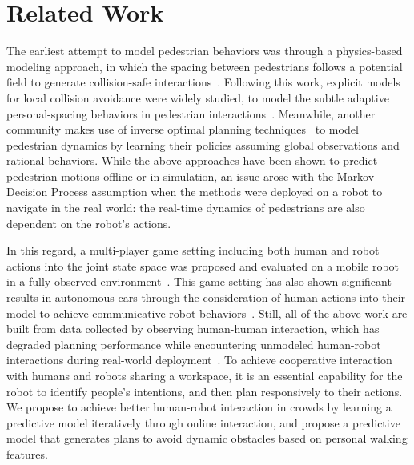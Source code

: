 \documentclass[conference]{IEEEtran}
\begin{document}
\section{Related Work}
\label{sec:related}
\vspace{-0.4em}
The earliest attempt to model pedestrian behaviors was through a physics-based 
modeling approach, in which the spacing between pedestrians follows a 
potential field to generate collision-safe 
interactions~\cite{helbing1995social}. Following this work, explicit models 
for local collision avoidance were widely studied, to model the subtle 
adaptive personal-spacing behaviors in pedestrian 
interactions~\cite{papadakis2014adaptive}. Meanwhile, another community 
makes use of inverse optimal planning 
techniques~\cite{ziebart2009planning,henry2010learning,vasquez2014inverse} to 
model pedestrian dynamics by learning their policies assuming global observations and 
rational behaviors.
While the above approaches have been shown to predict pedestrian motions 
offline or in simulation, an issue arose with the Markov Decision 
Process assumption when the methods were deployed on a robot to navigate in the real world:
the real-time dynamics of pedestrians are also dependent on the robot's 
actions. 

In this regard, a multi-player game setting including both human and robot actions into the joint state space was proposed and evaluated on a mobile robot in a fully-observed environment~\cite{trautman2010unfreezing}. This game setting has also shown significant results in autonomous cars through the consideration of human actions into their model to achieve communicative robot behaviors~\cite{sadigh2016planning}.
Still, all of the above work are built from data collected by observing human-human 
interaction, which has degraded planning performance while encountering unmodeled 
human-robot interactions during real-world 
deployment~\cite{trautman2015robot, pfeiffer2016predicting}. To achieve 
cooperative interaction with humans and robots sharing a workspace, it is 
an essential capability for the robot to identify people's 
intentions, and then plan responsively to their actions. We propose to achieve 
better human-robot interaction in crowds by learning a predictive model 
iteratively through online interaction, and propose a predictive model 
that generates plans to avoid dynamic obstacles based on personal walking features. 
\vspace{-0.1em}
\end{document}
